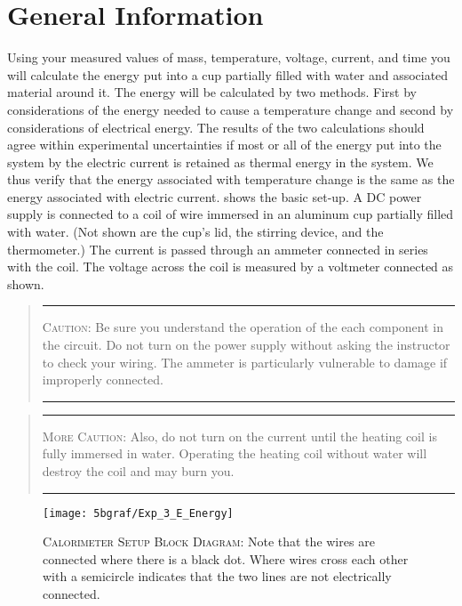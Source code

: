 \section{General Information}
Using your measured values of mass, temperature, voltage, current, and time you will calculate the energy put into a cup partially filled with water and associated material around it.  The energy will be calculated by two methods.  First by considerations of the energy needed to cause a temperature change and second by considerations of electrical energy.  The results of the two calculations should agree within experimental uncertainties if most or all of the energy put into the system by the electric current is retained as thermal energy in the system.  We thus verify that the energy associated with temperature change is the same as the energy associated with electric current. 
 shows the basic set-up.  A DC power supply is connected to a coil of wire immersed in an aluminum cup partially filled with water.  (Not shown are the cup's lid, the stirring device, and the thermometer.)  The current is passed through an ammeter connected in series with the coil.  The voltage across the coil is measured by a voltmeter connected as shown.  

\begin{quote}\hrule
\textsc{Caution:} Be sure you understand the operation of the each component in the circuit.  Do not turn on the power supply without asking the instructor to check your wiring.  The ammeter is particularly vulnerable to damage if improperly connected.  
\hrule
\end{quote}

\begin{quote}\hrule
\textsc{More Caution:} 
Also, do not turn on the current until the heating coil is fully immersed in water.  Operating the heating coil without water will destroy the coil and may burn you.
\hrule
\end{quote}

\begin{figure}
	\centering
	\texttt{[image: 5bgraf/Exp\_3\_E\_Energy]}
	\caption[Block Diagram for Calorimeter Setup]{\textsc{Calorimeter Setup Block Diagram}: Note that the wires are connected where there is a black dot.  Where wires cross each other with a semicircle indicates that the two lines are not electrically connected.}
	\label{f:calorimetry}
\end{figure}

